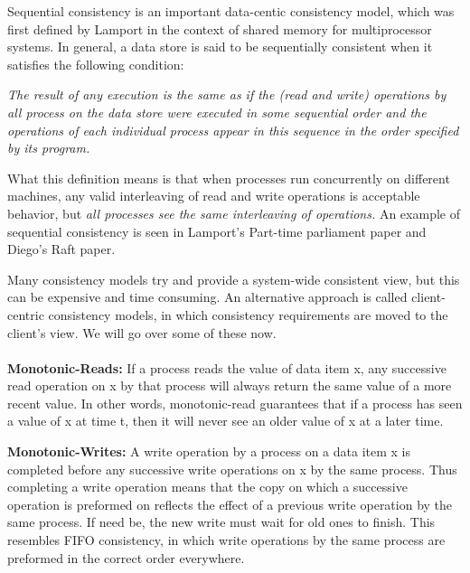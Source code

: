 \documentclass[9pt]{extarticle} %
\begin{document}
%
\begin{minipage}[t]{.64\linewidth} %
\vspace{-0.4cm}
\hypertarget{firstnews}{}
Sequential consistency is an important data-centic consistency model, which was first defined by Lamport in the context of shared memory for multiprocessor systems. In general, a data store is said to be sequentially consistent when it satisfies the following condition:
\begin{changemargin}{0.6cm}{0.6cm} 
\textit{The result of any execution is the same as if the (read and write) operations by all process on the data store were executed in some sequential order and the operations of each individual process appear in this sequence in the order specified by its program.}
\end{changemargin}
What this definition means is that when processes run concurrently on different machines, any valid interleaving of read and write operations is acceptable behavior, but \textit{all processes see the same interleaving of operations.} An example of sequential consistency is seen in Lamport's Part-time parliament paper and Diego's Raft paper.


\hypertarget{secondnews}{}

Many consistency models try and provide a system-wide consistent view, but this can be expensive and time consuming. An alternative approach is called client-centric consistency models, in which consistency requirements are moved to the client's view. We will go over some of these now. \\
\\
\textbf{Monotonic-Reads:} If a process reads the value of data item x, any successive read operation on x by that process will always return the same value of a more recent value. In other words, monotonic-read guarantees that if a process has seen a value of x at time t, then it will never see an older value of x at a later time.

\textbf{Monotonic-Writes:} A write operation by a process on a data item x is completed before any successive write operations on x by the same process. Thus completing a write operation means that the copy on which a successive operation is preformed on reflects the effect of a previous write operation by the same process. If need be, the new write must wait for old ones to finish. This resembles FIFO consistency, in which write operations by the same process are preformed in the correct order everywhere. 


\end{minipage}
\end{document}

